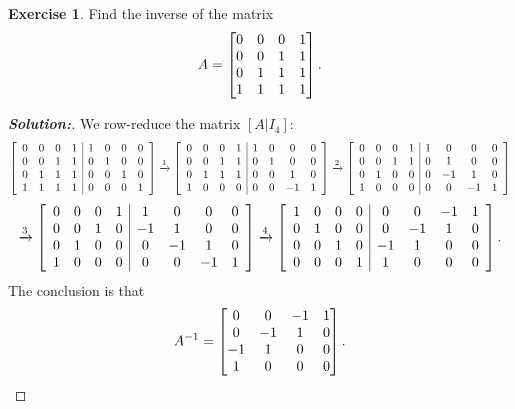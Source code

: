 \documentclass[a4paper]{amsart}
\theoremstyle{definition}
\newtheorem{exercise}{Exercise}
\newenvironment{solution}{\begin{proof}[\textbf{Solution:}] \vphantom{u}}{\end{proof}}
\begin{document}
\begin{exercise}\label{ex-inverse-i}
 Find the inverse of the matrix 
 \[ A = \left[\begin{matrix} 0&0&0&1 \\ 0&0&1&1 \\ 0&1&1&1 \\ 1&1&1&1 \end{matrix}\right]. \]
\end{exercise}
\begin{solution}
 We row-reduce the matrix $[A|I_4]$:
 \[ 
  \left[\begin{array}{cccc|cccc}
    0 & 0 & 0 & 1 & 1 & 0 & 0 & 0 \\ 
    0 & 0 & 1 & 1 & 0 & 1 & 0 & 0 \\ 
    0 & 1 & 1 & 1 & 0 & 0 & 1 & 0 \\ 
    1 & 1 & 1 & 1 & 0 & 0 & 0 & 1
  \end{array}\right]
  \xrightarrow{1}
  \left[\begin{array}{cccc|cccc}
    0 & 0 & 0 & 1 & 1 & 0 & 0 & 0 \\ 
    0 & 0 & 1 & 1 & 0 & 1 & 0 & 0 \\ 
    0 & 1 & 1 & 1 & 0 & 0 & 1 & 0 \\ 
    1 & 0 & 0 & 0 & 0 & 0 &-1 & 1
  \end{array}\right]
  \xrightarrow{2}
  \left[\begin{array}{cccc|cccc}
    0 & 0 & 0 & 1 & 1 & 0 & 0 & 0 \\ 
    0 & 0 & 1 & 1 & 0 & 1 & 0 & 0 \\ 
    0 & 1 & 0 & 0 & 0 &-1 & 1 & 0 \\ 
    1 & 0 & 0 & 0 & 0 & 0 &-1 & 1
  \end{array}\right]
 \] \[
  \xrightarrow{3}
  \left[\begin{array}{cccc|cccc}
    0 & 0 & 0 & 1 & 1 & 0 & 0 & 0 \\ 
    0 & 0 & 1 & 0 &-1 & 1 & 0 & 0 \\ 
    0 & 1 & 0 & 0 & 0 &-1 & 1 & 0 \\ 
    1 & 0 & 0 & 0 & 0 & 0 &-1 & 1
  \end{array}\right]
  \xrightarrow{4}
  \left[\begin{array}{cccc|cccc}
    1 & 0 & 0 & 0 & 0 & 0 &-1 & 1 \\
    0 & 1 & 0 & 0 & 0 &-1 & 1 & 0 \\ 
    0 & 0 & 1 & 0 &-1 & 1 & 0 & 0 \\ 
    0 & 0 & 0 & 1 & 1 & 0 & 0 & 0 
  \end{array}\right].
 \] 
 The conclusion is that 
 \[ 
  A^{-1} = \left[\begin{matrix} 
    0 &  0 & -1 &  1 \\
    0 & -1 &  1 &  0 \\
   -1 &  1 &  0 &  0 \\
    1 &  0 &  0 &  0 
  \end{matrix}\right].
 \]
\end{solution}
\end{document}
